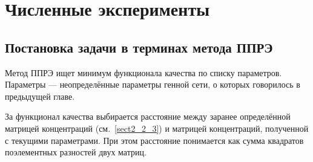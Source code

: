 \chapter{Численные эксперименты} \label{chapt3}
\section{Постановка задачи в терминах метода ППРЭ} \label{sect3_1}

Метод ППРЭ ищет минимум функционала качества по списку параметров. Параметры — 
неопределённые параметры генной сети, о которых говорилось в предыдущей главе. 

За функционал качества выбирается расстояние между заранее определённой матрицей 
концентраций (см.~\ref{sect2_2_3}) и матрицей концентраций, полученной с 
текущими параметрами. При этом расстояние понимается как сумма квадратов 
поэлементных разностей двух матриц.

